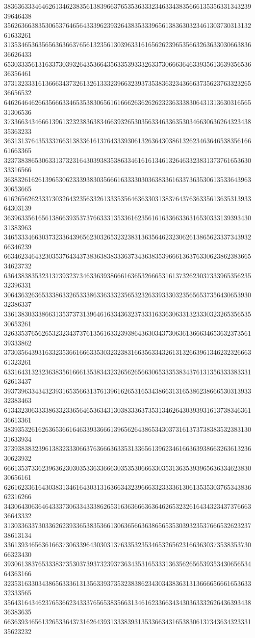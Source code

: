38363633346462613462383561383966376535363332346334383566613535633134323939646438
35626366383530653764656433396239326438353339656138363032346130373031313261633261
31353465363565636366376561323561303963316165626239653566326363303066383636626433
65303335613163373039326435366435633539333263373066636463393561363935653636356461
37313233316136663437326132613332396632393735383632343666373562376332326536656532
64626464626635666334653538306561616662636262623236333830643131363031656531306536
37336634346661396132323836383466393265303563346336353034663063626432343835363233
36313137643533376631383361613764333930613263643038613262346364653835616661663365
32373838653063313732316430393835386334616161346132646332383137376165363033316566
36383261626139653062333938303566616333303036383361633736353061353364396330653665
61626562623337303264323563326133353564636330313837643763633561363531393364303139
36396335616561386639353737663331353361623561616336633631653033313939343031383963
34653334663037323364396562303265323238313635646232306261386562333734393266346239
66346234643230353764343738363838333637343638353966613637633062386238366534623732
63643838353231373932373463363938666163653266653161373262303733396535623532396331
30643632636533386332653338633633323565323263393330323565653735643065393032386337
33613830333866313537373139646163343632373331633630633132333032326535653530653261
32633537656265323234373761356163323938643630343730636136663465363237356139333862
37303564393163323536616663353032323831663563343261313266396134623232666361323261
63316431323236383561666135383432326562656630653335383437613135633338333162613437
39373963343432393165356631376139616265316534386631316538623866653031393332383463
61343230633338633233656465363431303833363735313462643039393161373834636136613361
38393532616263653661646339336661396562643865343037316137373838353238313031633934
37393838323961383233306637636663633531336561396234616636393866326361323630623932
66613537336239636230303533633666303535306663303531363539396563633462383030656161
62616233616430383134616430313163663432396663323333613061353530376534383662316266
34306430636464333730633433386265316363666363646265323261643432343737666336643332
31303363373033626239336538353661306365663638656535303932353766653262323738613134
33613934656361663730633964303031376335323534653265623166363037353835373066323430
39306138376533383735303739373239373634353165333136356265653935343065653464363166
32353163303438656333613135633937353238386234303438363131366665666165363332333565
35643164346237653662343337656538356631346162336634343036333262643639343836383635
66363934656132653364373162643931333839313533663431653830613734363432333135623232
